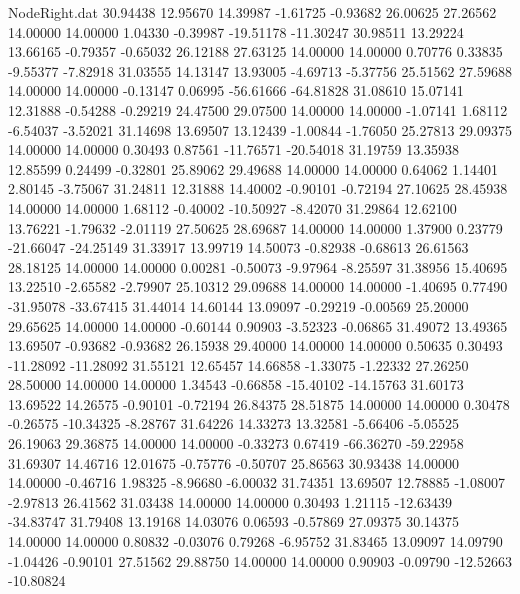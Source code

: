\begin{filecontents}{NodeRight.dat}
  30.94438   12.95670   14.39987    -1.61725   -0.93682   26.00625   27.26562   14.00000   14.00000    1.04330   -0.39987  -19.51178  -11.30247
  30.98511   13.29224   13.66165    -0.79357   -0.65032   26.12188   27.63125   14.00000   14.00000    0.70776    0.33835   -9.55377   -7.82918
  31.03555   14.13147   13.93005    -4.69713   -5.37756   25.51562   27.59688   14.00000   14.00000   -0.13147    0.06995  -56.61666  -64.81828
  31.08610   15.07141   12.31888    -0.54288   -0.29219   24.47500   29.07500   14.00000   14.00000   -1.07141    1.68112   -6.54037   -3.52021
  31.14698   13.69507   13.12439    -1.00844   -1.76050   25.27813   29.09375   14.00000   14.00000    0.30493    0.87561  -11.76571  -20.54018
  31.19759   13.35938   12.85599     0.24499   -0.32801   25.89062   29.49688   14.00000   14.00000    0.64062    1.14401    2.80145   -3.75067
  31.24811   12.31888   14.40002    -0.90101   -0.72194   27.10625   28.45938   14.00000   14.00000    1.68112   -0.40002  -10.50927   -8.42070
  31.29864   12.62100   13.76221    -1.79632   -2.01119   27.50625   28.69687   14.00000   14.00000    1.37900    0.23779  -21.66047  -24.25149
  31.33917   13.99719   14.50073    -0.82938   -0.68613   26.61563   28.18125   14.00000   14.00000    0.00281   -0.50073   -9.97964   -8.25597
  31.38956   15.40695   13.22510    -2.65582   -2.79907   25.10312   29.09688   14.00000   14.00000   -1.40695    0.77490  -31.95078  -33.67415
  31.44014   14.60144   13.09097    -0.29219   -0.00569   25.20000   29.65625   14.00000   14.00000   -0.60144    0.90903   -3.52323   -0.06865
  31.49072   13.49365   13.69507    -0.93682   -0.93682   26.15938   29.40000   14.00000   14.00000    0.50635    0.30493  -11.28092  -11.28092
  31.55121   12.65457   14.66858    -1.33075   -1.22332   27.26250   28.50000   14.00000   14.00000    1.34543   -0.66858  -15.40102  -14.15763
  31.60173   13.69522   14.26575    -0.90101   -0.72194   26.84375   28.51875   14.00000   14.00000    0.30478   -0.26575  -10.34325   -8.28767
  31.64226   14.33273   13.32581    -5.66406   -5.05525   26.19063   29.36875   14.00000   14.00000   -0.33273    0.67419  -66.36270  -59.22958
  31.69307   14.46716   12.01675    -0.75776   -0.50707   25.86563   30.93438   14.00000   14.00000   -0.46716    1.98325   -8.96680   -6.00032
  31.74351   13.69507   12.78885    -1.08007   -2.97813   26.41562   31.03438   14.00000   14.00000    0.30493    1.21115  -12.63439  -34.83747
  31.79408   13.19168   14.03076     0.06593   -0.57869   27.09375   30.14375   14.00000   14.00000    0.80832   -0.03076    0.79268   -6.95752
  31.83465   13.09097   14.09790    -1.04426   -0.90101   27.51562   29.88750   14.00000   14.00000    0.90903   -0.09790  -12.52663  -10.80824

\end{filecontents}
